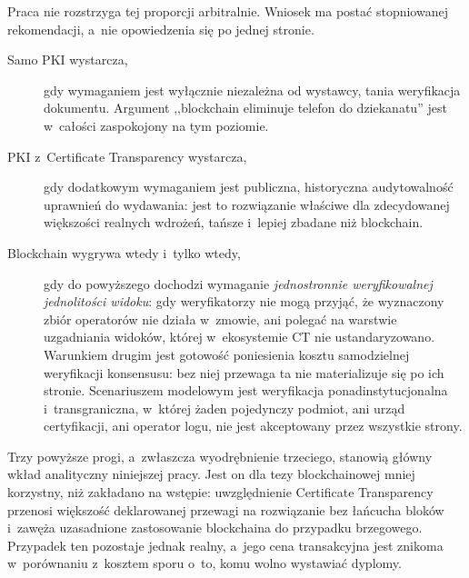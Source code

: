 Praca nie rozstrzyga tej proporcji arbitralnie. Wniosek ma postać stopniowanej
rekomendacji, a~nie opowiedzenia się po jednej stronie.

\begin{description}
  \item[Samo PKI wystarcza,] gdy wymaganiem jest wyłącznie niezależna od wystawcy,
        tania weryfikacja dokumentu. Argument ,,blockchain eliminuje telefon do
        dziekanatu'' jest w~całości zaspokojony na tym poziomie.
  \item[PKI z~Certificate Transparency wystarcza,] gdy dodatkowym wymaganiem jest
        publiczna, historyczna audytowalność uprawnień do wydawania: jest to
        rozwiązanie właściwe dla zdecydowanej większości realnych wdrożeń,
        tańsze i~lepiej zbadane niż blockchain.
  \item[Blockchain wygrywa wtedy i~tylko wtedy,] gdy do powyższego dochodzi
        wymaganie \emph{jednostronnie weryfikowalnej jednolitości widoku}: gdy
        weryfikatorzy nie mogą przyjąć, że wyznaczony zbiór operatorów nie
        działa w~zmowie, ani polegać na warstwie uzgadniania widoków, której
        w~ekosystemie CT nie ustandaryzowano. Warunkiem drugim jest gotowość
        poniesienia kosztu samodzielnej weryfikacji konsensusu: bez niej
        przewaga ta nie materializuje się po ich stronie.
        Scenariuszem modelowym jest weryfikacja
        ponadinstytucjonalna i~transgraniczna, w~której żaden pojedynczy podmiot,
        ani urząd certyfikacji, ani operator logu, nie jest akceptowany
        przez wszystkie strony.
\end{description}

Trzy powyższe progi, a~zwłaszcza wyodrębnienie trzeciego, stanowią główny wkład
analityczny niniejszej pracy. Jest on dla tezy blockchainowej mniej korzystny,
niż zakładano na wstępie: uwzględnienie Certificate Transparency przenosi
większość deklarowanej przewagi na rozwiązanie bez łańcucha bloków i~zawęża
uzasadnione zastosowanie blockchaina do przypadku brzegowego. Przypadek ten
pozostaje jednak realny, a~jego cena transakcyjna jest znikoma w~porównaniu
z~kosztem sporu o~to, komu wolno wystawiać dyplomy.
